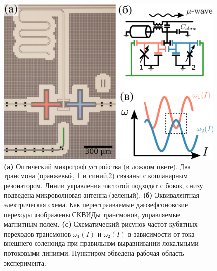 \documentclass[14pt, a4paper]{extarticle}
\begin{document}
\begin{figure}[t]
	\centering
	\includegraphics[width=0.7\linewidth]{Pictures/experiment_2}
	\caption{\textbf{(а)} Оптический микрограф устройства (в ложном цвете). Два трансмона (оранжевый, 1 и синий,2) связаны с  копланарным резонатором. Линии управления частотой подходят с боков, снизу подведена микроволновая антенна (зеленый). \textbf{(б)} Эквивалентная электрическая схема. Как перестраиваемые джозефсоновские переходы изображены СКВИДы трансмонов, управляемые магнитным полем. \textbf{(c)} Схематический рисунок частот кубитных переходов трансмонов $\omega_1 (I)$ и $\omega_2 (I)$ в зависимости от тока внешнего соленоида при правильном выравнивании локальными потоковыми линиями. Пунктиром обведена рабочая область эксперимента.}
	\label{fig:experiment2}
\end{figure}
\end{document}

